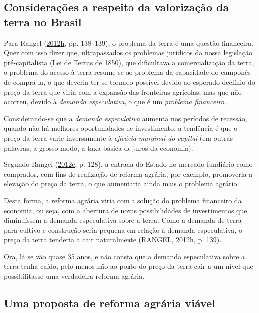 \documentclass[a4paper, 12pt]{article}
\begin{document}
\hypertarget{consideracoes-a-respeito-da-valorizacao-da-terra-no-brasil}{%
\subsection{Considerações a respeito da valorização da terra no
Brasil}\label{consideracoes-a-respeito-da-valorizacao-da-terra-no-brasil}}

Para Rangel
(\protect\hyperlink{ref-rangel1986b}{2012}\protect\hyperlink{ref-rangel1986b}{h},
pp. 138--139), o problema da terra é uma questão financeira. Quer com
isso dizer que, ultrapassados os problemas jurídicos da nossa legislação
pré-capitalista (Lei de Terras de 1850), que dificultava a
comercialização da terra, o problema do acesso à terra resume-se ao
problema da capacidade do camponês de comprá-la, o que deveria ter se
tornado possível devido ao esperado declínio do preço da terra que viria
com a expansão das fronteiras agrícolas, mas que não ocorreu, devido à
\emph{demanda especulativa}, o que é um \emph{problema financeiro}.

Considerando-se que a \emph{demanda especulativa} aumenta nos períodos
de recessão, quando não há melhores oportunidades de investimento, a
tendência é que o preço da terra varie inversamente à \emph{eficácia
marginal do capital} (em outras palavras, a grosso modo, a taxa básica
de juros da economia).

Segundo Rangel
(\protect\hyperlink{ref-rangel1985}{2012}\protect\hyperlink{ref-rangel1985}{e},
p. 128), a entrada do Estado no mercado fundiário como comprador, com
fins de realização de reforma agrária, por exemplo, promoveria a
elevação do preço da terra, o que aumentaria ainda mais o problema
agrário.

Desta forma, a reforma agrária viria com a solução do problema
financeiro da economia, ou seja, com a abertura de novas possibilidades
de investimentos que diminuíssem a demanda especulativa sobre a terra.
Como a demanda de terra para cultivo e construção seria pequena em
relação à demanda especulativa, o preço da terra tenderia a cair
naturalmente (RANGEL,
\protect\hyperlink{ref-rangel1986b}{2012}\protect\hyperlink{ref-rangel1986b}{h},
p. 139).

Ora, lá se vão quase 35 anos, e não consta que a demanda especulativa
sobre a terra tenha caído, pelo menos não ao ponto do preço da terra
cair a um nível que possibilitasse uma verdadeira reforma agrária.

\hypertarget{uma-proposta-de-reforma-agraria-viavel}{%
\subsection{Uma proposta de reforma agrária
viável}\label{uma-proposta-de-reforma-agraria-viavel}}
\end{document}
